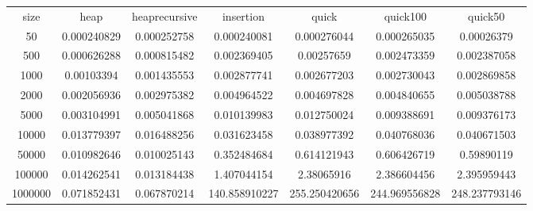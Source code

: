 \begin{table}
\begin{tabular}{ccccccc}
size & heap & heaprecursive & insertion & quick & quick100 & quick50 \\
50 & 0.000240829 & 0.000252758 & 0.000240081 & 0.000276044 & 0.000265035 & 0.00026379 \\
500 & 0.000626288 & 0.000815482 & 0.002369405 & 0.00257659 & 0.002473359 & 0.002387058 \\
1000 & 0.00103394 & 0.001435553 & 0.002877741 & 0.002677203 & 0.002730043 & 0.002869858 \\
2000 & 0.002056936 & 0.002975382 & 0.004964522 & 0.004697828 & 0.004840655 & 0.005038788 \\
5000 & 0.003104991 & 0.005041868 & 0.010139983 & 0.012750024 & 0.009388691 & 0.009376173 \\
10000 & 0.013779397 & 0.016488256 & 0.031623458 & 0.038977392 & 0.040768036 & 0.040671503 \\
50000 & 0.010982646 & 0.010025143 & 0.352484684 & 0.614121943 & 0.606426719 & 0.59890119 \\
100000 & 0.014262541 & 0.013184438 & 1.407044154 & 2.38065916 & 2.386604456 & 2.395959443 \\
1000000 & 0.071852431 & 0.067870214 & 140.858910227 & 255.250420656 & 244.969556828 & 248.237793146 \\
\end{tabular}
\end{table}
